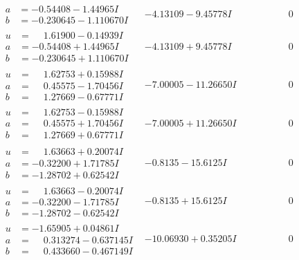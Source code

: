 \documentclass[1p]{elsarticle_modified}
\theoremstyle{definition}
\begin{document}
$$\begin{array}{c|c|c}
\begin{aligned}
a &= -0.54408 - 1.44965 I \\
b &= -0.230645 - 1.110670 I\end{aligned}
 & -4.13109 - 9.45778 I & \phantom{-0.000000 } 0 \\ \hline\begin{aligned}
u &= \phantom{-}1.61900 - 0.14939 I \\
a &= -0.54408 + 1.44965 I \\
b &= -0.230645 + 1.110670 I\end{aligned}
 & -4.13109 + 9.45778 I & \phantom{-0.000000 } 0 \\ \hline\begin{aligned}
u &= \phantom{-}1.62753 + 0.15988 I \\
a &= \phantom{-}0.45575 - 1.70456 I \\
b &= \phantom{-}1.27669 - 0.67771 I\end{aligned}
 & -7.00005 - 11.26650 I & \phantom{-0.000000 } 0 \\ \hline\begin{aligned}
u &= \phantom{-}1.62753 - 0.15988 I \\
a &= \phantom{-}0.45575 + 1.70456 I \\
b &= \phantom{-}1.27669 + 0.67771 I\end{aligned}
 & -7.00005 + 11.26650 I & \phantom{-0.000000 } 0 \\ \hline\begin{aligned}
u &= \phantom{-}1.63663 + 0.20074 I \\
a &= -0.32200 + 1.71785 I \\
b &= -1.28702 + 0.62542 I\end{aligned}
 & -0.8135 - 15.6125 I & \phantom{-0.000000 } 0 \\ \hline\begin{aligned}
u &= \phantom{-}1.63663 - 0.20074 I \\
a &= -0.32200 - 1.71785 I \\
b &= -1.28702 - 0.62542 I\end{aligned}
 & -0.8135 + 15.6125 I & \phantom{-0.000000 } 0 \\ \hline\begin{aligned}
u &= -1.65905 + 0.04861 I \\
a &= \phantom{-}0.313274 - 0.637145 I \\
b &= \phantom{-}0.433660 - 0.467149 I\end{aligned}
 & -10.06930 + 0.35205 I & \phantom{-0.000000 } 0 \\ \hline\begin{aligned}

\end{aligned}
\end{array}$$
\end{document}
